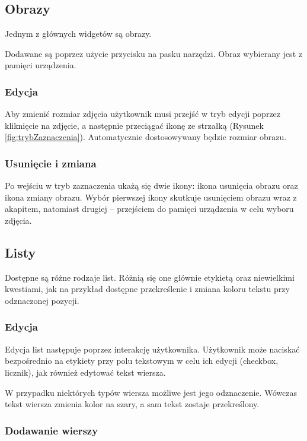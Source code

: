 \subsection{Obrazy}

Jednym z głównych widgetów są obrazy. 

Dodawane są poprzez użycie przycisku na pasku narzędzi. Obraz wybierany jest z pamięci urządzenia.

\subsubsection{Edycja}

Aby zmienić rozmiar zdjęcia użytkownik musi przejść w tryb edycji poprzez kliknięcie na zdjęcie, a następnie przeciągać ikonę ze strzałką (Rysunek \ref{fig:trybZaznaczenia}). Automatycznie dostosowywany będzie rozmiar obrazu.

\subsubsection{Usunięcie i zmiana}

Po wejściu w tryb zaznaczenia ukażą się dwie ikony: ikona usunięcia obrazu oraz ikona zmiany obrazu.
Wybór pierwszej ikony skutkuje usunięciem obrazu wraz z akapitem, natomiast drugiej -- przejściem do pamięci urządzenia w celu wyboru zdjęcia.

\subsection{Listy}

Dostępne są różne rodzaje list. Różnią się one głównie etykietą oraz niewielkimi kwestiami, jak na przykład dostępne przekreślenie i zmiana koloru tekstu przy odznaczonej pozycji.

\subsubsection{Edycja}

Edycja list następuje poprzez interakcję użytkownika. Użytkownik może naciskać bezpośrednio na etykiety przy polu tekstowym w celu ich edycji (checkbox, licznik), jak również edytować tekst wiersza.

W przypadku niektórych typów wiersza możliwe jest jego odznaczenie. Wówczas tekst wiersza zmienia kolor na szary, a sam tekst zostaje przekreślony.

\subsubsection{Dodawanie wierszy}

